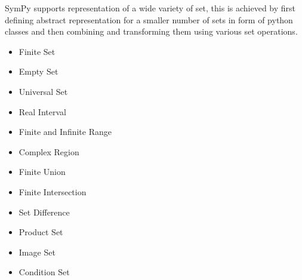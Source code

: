 
SymPy supports representation of a wide variety of set, this is achieved by
first defining abstract representation for a smaller number of sets in form of
python classes and then combining and transforming them using various set
operations.


\begin{itemize}
    \item Finite Set
    \item Empty Set
    \item Universal Set
    \item Real Interval
    \item Finite and Infinite Range
    \item Complex Region
\end{itemize}



\begin{itemize}
    \item Finite Union
    \item Finite Intersection
    \item Set Difference
    \item Product Set
    \item Image Set
    \item Condition Set
\end{itemize}



